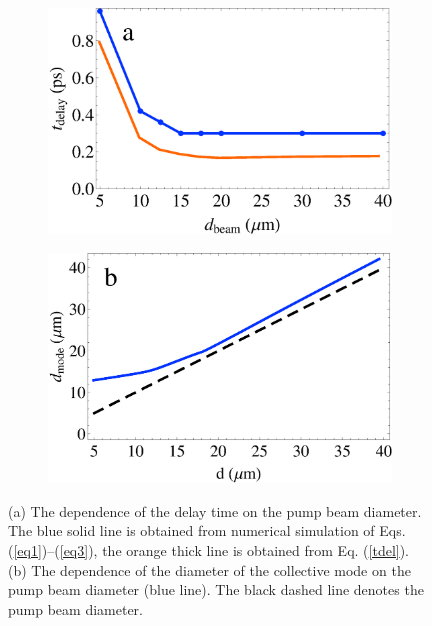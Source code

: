 \documentclass[aps,pra,amsmath,amssymb,onecolumn,superscriptaddress,showpacs,floatfix,]{revtex4-1}
\begin{document}
\begin{figure}[h]
	\centering
	\begin{subfigure}[h]{0.45\linewidth}
		\includegraphics[width=\linewidth]{Fig5a.eps}
	\end{subfigure}
	\begin{subfigure}[h]{0.45\linewidth}
		\includegraphics[width=\linewidth]{Fig5b.eps}
	\end{subfigure}
	\caption{(a) The dependence of the delay time on the pump beam diameter. The blue solid line is obtained from numerical simulation of Eqs. (\ref{eq1})--(\ref{eq3}), the orange thick line is obtained from Eq. (\ref{tdel}). (b) The dependence of the diameter of the collective mode on the pump beam diameter (blue line). The black dashed line denotes the pump beam diameter.
	}
	\label{fig5}
\end{figure}
\end{document}
